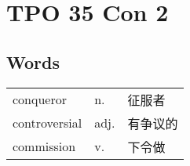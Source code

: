 \section{TPO 35 Con 2}

\subsection{Words}

\begin{tabular}{lll}
    conqueror     & n.   & 征服者  \\
    controversial & adj. & 有争议的 \\
    commission    & v.   & 下令做  \\
\end{tabular}
